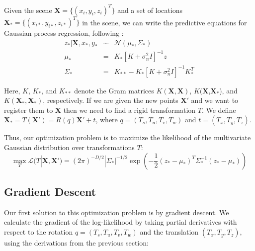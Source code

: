 \documentclass{article} %
\begin{document}
Given the scene $\mathbf{X} = \{(x_i,y_i,z_i)^T\}$ and a set of locations $\mathbf{X}_{*} = \{(x_{i*},y_{i*},z_{i*})^T\}$ in the scene, we can write the predictive equations for Gaussian process regression, following \cite{rasmussen2006gaussian}:
\begin{eqnarray}
z_{*} | \mathbf{X}, x_*,y_* &\sim& \mathcal{N}(\mu_*, \Sigma_*) \\
\mu_* &=& K_*[K + \sigma_n^2 I]^{-1} z \\
\Sigma_* &=& K_{**} - K_*[K + \sigma_n^2 I]^{-1} K_*^T
\end{eqnarray}


Here, $K$, $K_*$, and $K_{**}$ denote the Gram matrices $K(\mathbf{X},\mathbf{X})$, $K(\mathbf{X}$,$\mathbf{X_*}$), and $K(\mathbf{X_*},\mathbf{X_*})$, respectively. If we are given the new points $\mathbf{X'}$ and we want to register them to $\mathbf{X}$ then we need to find a rigid transformation $T$. We define $\mathbf{X_*} = T(\mathbf{X'}) = R(q)\mathbf{X'} + t$, where $q = (T_s, T_u,T_v,T_w)$ and $t = (T_x, T_y, T_z)$. 


Thus, our optimization problem is to maximize the likelihood of the multivariate Gaussian distribution over transformations $T$:
\begin{equation}
\max_T \mathcal{L}(T|\mathbf{X}, \mathbf{X'}) = (2\pi)^{-D/2} |\Sigma_*|^{-1/2} \exp(-\frac{1}{2} (z_* - \mu_*)^T \Sigma_*^{-1} (z_* - \mu_*))
\end{equation}


\subsection{Gradient Descent}
\label{sec:gradient}
Our first solution to  this optimization problem is by gradient descent. 
We calculate the gradient of the log-likelihood by taking partial derivatives with respect to the rotation $q = (T_s, T_u,T_v,T_w)$ and the translation $(T_x, T_y, T_z)$, using the derivations from the previous section:
\end{document}
